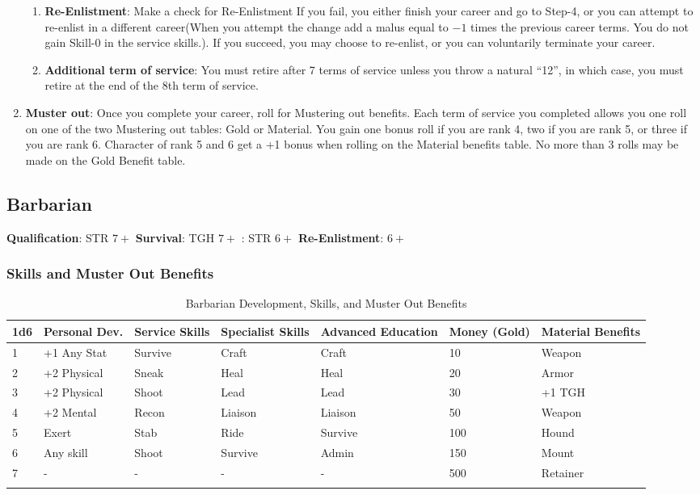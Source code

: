 \documentclass[itdr/core]{subfiles}
\begin{document}
\begin{enumerate}
\begin{enumerate}
\item \textbf{Re-Enlistment}: Make a check for Re-Enlistment If you fail, you either finish your career and go to Step-4, or
    you can attempt to re-enlist in a different career(When you attempt the change add a malus equal to $-1$ times the
    previous career terms. You do not gain Skill-$0$ in the service skills.). If you succeed, you may choose to re-enlist, or you can voluntarily terminate your career. 

\item \textbf{Additional term of service}: You must retire after 7 terms of service unless you throw a natural ``12'', in which case, you must retire at the end of the 8th term of service. 
\end{enumerate}
  \item \textbf{Muster out}: Once you complete your career, roll for Mustering out benefits.  Each term of service you completed allows you one roll on one of the two Mustering out tables: Gold or Material. You gain one bonus roll if you are rank 4, two if you are rank 5, or three if you are rank 6. Character of rank 5 and 6 get a +1 bonus when rolling on the Material benefits table. No more than 3 rolls may be made on the Gold Benefit table.
\end{enumerate}
\subsection{Barbarian}
\textbf{Qualification}: STR $7+$
\textbf{Survival}: TGH $7+$
: STR $6+$
\textbf{Re-Enlistment}: $6+$ 
\subsubsection{Skills and Muster Out Benefits}
\begin{longtable}{p{} p{} p{} p{} p{} p{} p{}}
\hline
\textbf{1d6} & \textbf{Personal Dev.} & \textbf{Service Skills} & \textbf{Specialist Skills} & \textbf{Advanced Education} & \textbf{Money (Gold)} & \textbf{Material Benefits} \\
\hline
1 & +1 Any Stat & Survive & Craft & Craft & 10 & Weapon \\
2 & +2 Physical & Sneak & Heal & Heal & 20 & Armor \\
3 & +2 Physical & Shoot & Lead & Lead & 30 & +1 TGH \\
4 & +2 Mental & Recon & Liaison & Liaison & 50 & Weapon \\
5 & Exert & Stab & Ride & Survive & 100 & Hound \\
6 & Any skill & Shoot & Survive & Admin & 150 & Mount \\
7 & - & - & - & - & 500 & Retainer \\
\hline
\caption{Barbarian Development, Skills, and Muster Out Benefits}
\end{longtable}
\end{document}
